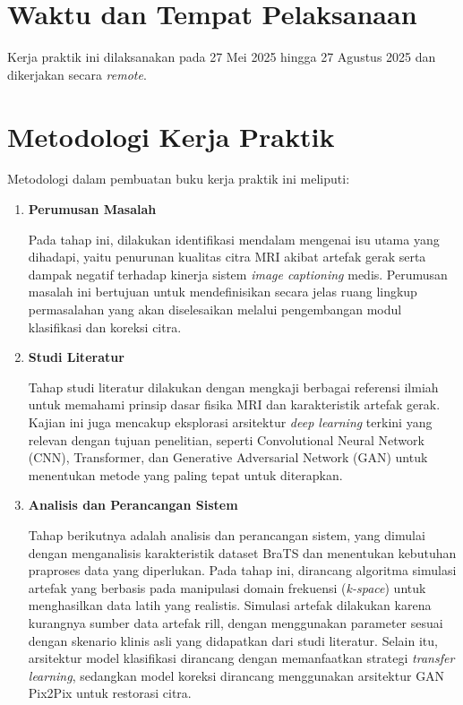 \section{Waktu dan Tempat Pelaksanaan}

Kerja praktik ini dilaksanakan pada 27 Mei 2025 hingga 27 Agustus 2025 dan dikerjakan secara \textit{remote}. 

\section{Metodologi Kerja Praktik}

Metodologi dalam pembuatan buku kerja praktik ini meliputi:

\begin{enumerate}[nolistsep]

  \item \textbf{Perumusan Masalah}

  Pada tahap ini, dilakukan identifikasi mendalam mengenai isu utama yang dihadapi, yaitu penurunan kualitas citra MRI akibat artefak gerak serta dampak negatif terhadap kinerja sistem \textit{image captioning} medis. Perumusan masalah ini bertujuan untuk mendefinisikan secara jelas ruang lingkup permasalahan yang akan diselesaikan melalui pengembangan modul klasifikasi dan koreksi citra.

  \item \textbf{Studi Literatur}

  Tahap studi literatur dilakukan dengan mengkaji berbagai referensi ilmiah untuk memahami prinsip dasar fisika MRI dan karakteristik artefak gerak. Kajian ini juga mencakup eksplorasi arsitektur \textit{deep learning} terkini yang relevan dengan tujuan penelitian, seperti Convolutional Neural Network (CNN), Transformer, dan Generative Adversarial Network (GAN) untuk menentukan metode yang paling tepat untuk diterapkan.

  \item \textbf{Analisis dan Perancangan Sistem}

  Tahap berikutnya adalah analisis dan perancangan sistem, yang dimulai dengan menganalisis karakteristik dataset BraTS dan menentukan kebutuhan praproses data yang diperlukan. Pada tahap ini, dirancang algoritma simulasi artefak yang berbasis pada manipulasi domain frekuensi (\textit{k-space}) untuk menghasilkan data latih yang realistis. Simulasi artefak dilakukan karena kurangnya sumber data artefak rill, dengan menggunakan parameter sesuai dengan skenario klinis asli yang didapatkan dari studi literatur. Selain itu, arsitektur model klasifikasi dirancang dengan memanfaatkan strategi \textit{transfer learning}, sedangkan model koreksi dirancang menggunakan arsitektur GAN Pix2Pix untuk restorasi citra.


\end{enumerate}
